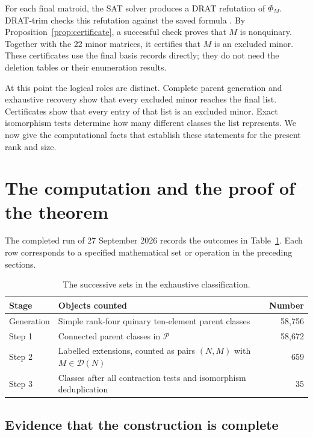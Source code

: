 \documentclass[11pt,a4paper]{article}
\theoremstyle{definition}
\begin{document}
For each final matroid, the SAT solver produces a DRAT refutation
of $\Phi_M$. DRAT-trim checks this refutation against the saved
formula \cite{drat}. By Proposition~\ref{prop:certificate}, a
successful check proves that $M$ is nonquinary. Together with
the 22 minor matrices, it certifies that $M$ is an excluded
minor. These certificates use the final basis records directly;
they do not need the deletion tables or their enumeration results.

At this point the logical roles are distinct. Complete parent
generation and exhaustive recovery show that every excluded
minor reaches the final list. Certificates show that every entry
of that list is an excluded minor. Exact isomorphism tests
determine how many different classes the list represents. We
now give the computational facts that establish these statements
for the present rank and size.

\section{The computation and the proof of the theorem}\label{sec:computation}

The completed run of 27 September 2026 records the outcomes in
Table~\ref{tab:stages}. Each row corresponds to a specified
mathematical set or operation in the preceding sections.

\begin{table}[htbp]
\centering
\begin{tabular}{p{22mm}p{95mm}r}
\toprule
Stage & Objects counted & Number\\
\midrule
Generation & Simple rank-four quinary ten-element parent classes
             & 58,756\\
Step 1 & Connected parent classes in $\mathcal P$ & 58,672\\
Step 2 & Labelled extensions, counted as pairs
         $(N,M)$ with $M\in\mathcal D(N)$ & 659\\
Step 3 & Classes after all contraction tests and isomorphism
         deduplication & 35\\
\bottomrule
\end{tabular}
\caption{The successive sets in the exhaustive classification.}
\label{tab:stages}
\end{table}

\subsection{Evidence that the construction is complete}
\end{document}
